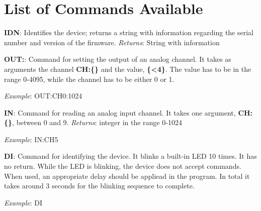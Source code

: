 \section{List of Commands Available}\label{list-of-commandsavailable}
\textbf{{IDN}}: Identifies the device; returns a string with information
regarding the serial number and version of the firmware. \emph{Returns}:
String with information

\textbf{{OUT}:}: Command for setting the output of an analog channel. It
takes as arguments the channel \textbf{{CH}:\{\}} and the value,
\textbf{\{\textless{}4\}}. The value has to be in the range 0-4095,
while the channel has to be either 0 or 1.

\emph{Example}: {OUT}:{CH0}:1024

\textbf{{IN}}: Command for reading an analog input channel. It takes one
argument, \textbf{{CH}:\{\}}, between 0 and 9. \emph{Returns}: integer
in the range 0-1024

\emph{Example}: {IN}:{CH5}

\textbf{{DI}}: Command for identifying the device. It blinks a built-in LED 10 times.
It has no return. While the LED is blinking, the device does not accept commands. When 
used, an appropriate delay should be appliead in the program. In total it takes around 3 
seconds for the blinking sequence to complete.

\emph{Example}: {DI}
